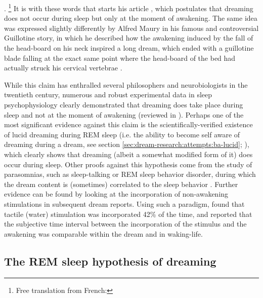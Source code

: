 . \footnote{Free translation from French: } It is with these words that \citet{goblot_souvenir_1896} starts his article , which postulates that dreaming does not occur during sleep but only at the moment of awakening. The same idea was expressed slightly differently by Alfred Maury in his famous and controversial Guillotine story, in which he described how the awakening induced by the fall of the head-board on his neck inspired a long dream, which ended with a guillotine blade falling at the exact same point where the head-board of the bed had actually struck his cervical vertebrae \citep{maury_sommeil_1865}.

While this claim has enthralled several philosophers and neurobiologists in the twentieth century, numerous and robust experimental data in sleep psychophysiology clearly demonstrated that dreaming does take place during sleep and not at the moment of awakening (reviewed in \citealp{guenole_reve_2010}). Perhaps one of the most significant evidence against this claim is the scientifically-verified existence of lucid dreaming during REM sleep (i.e. the ability to become self aware of dreaming during a dream, see section \ref{sec:dream-research:attempts:ba-lucid}; \citealp{laberge_exploring_1991, dresler_neural_2012}), which clearly shows that dreaming (albeit a somewhat modified form of it) does occur during sleep. Other proofs against this hypothesis come from the study of parasomnias, such as sleep-talking or REM sleep behavior disorder, during which the dream content is (sometimes) correlated to the sleep behavior \citep{ellman_mind_1991, schenck_rem_2002, leclair-visonneau_eyes_2010}. Further evidence can be found by looking at the incorporation of non-awakening stimulations in subsequent dream reports. Using such a paradigm, \citet{dement_relation_1958} found that tactile (water) stimulation was incorporated 42\% of the time, and reported that the subjective time interval between the incorporation of the stimulus and the awakening was comparable within the dream and in waking-life.

\subsection{The REM sleep hypothesis of dreaming}
\label{sec:dream-research:link:rem-sleep}

